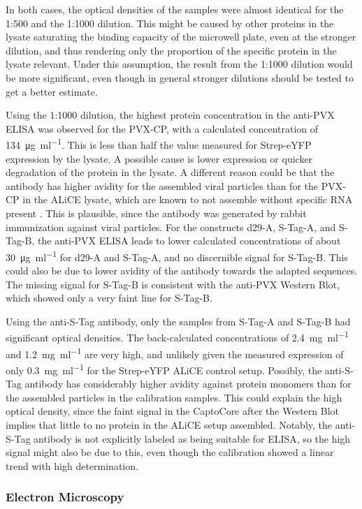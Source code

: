In both cases, the optical densities of the samples were almost identical for the 1:500 and the 1:1000 dilution. This might be caused by other proteins in the lysate saturating the binding capacity of the microwell plate, even at the stronger dilution, and thus rendering only the proportion of the specific protein in the lysate relevant. Under this assumption, the result from the 1:1000 dilution would be more significant, even though in general stronger dilutions should be tested to get a better estimate. 

Using the 1:1000 dilution, the highest protein concentration in the anti-PVX ELISA was observed for the PVX-CP, with a calculated concentration of \SI{134}{\micro\gram\per\milli\litre}. This is less than half the value measured for Strep-eYFP expression by the lysate. A possible cause is lower expression or quicker degradation of the protein in the lysate. A different reason could be that the antibody has higher avidity for the assembled viral particles than for the PVX-CP in the ALiCE lysate, which are known to not assemble without specific RNA present \cite{pvx_assembly}. This is plausible, since the antibody was generated by rabbit immunization against viral particles. For the constructs d29-A, S-Tag-A, and S-Tag-B, the anti-PVX ELISA leads to lower calculated concentrations of about \SI{30}{\micro\gram\per\milli\litre} for d29-A and S-Tag-A, and no discernible signal for S-Tag-B. This could also be due to lower avidity of the antibody towards the adapted sequences. The missing signal for S-Tag-B is consistent with the anti-PVX Western Blot, which showed only a very faint line for S-Tag-B. 

Using the anti-S-Tag antibody, only the samples from S-Tag-A and S-Tag-B had significant optical densities. The back-calculated concentrations of \SI{2.4}{\milli\gram\per\milli\litre} and \SI{1.2}{\milli\gram\per\milli\litre} are very high, and unlikely given the measured expression of only \SI{0.3}{\milli\gram\per\milli\litre} for the Strep-eYFP ALiCE control setup. Possibly, the anti-S-Tag antibody has considerably higher avidity against protein monomers than for the assembled particles in the calibration samples. This could explain the high optical density, since the faint signal in the CaptoCore after the Western Blot implies that little to no protein in the ALiCE setup assembled. Notably, the anti-S-Tag antibody is not explicitly labeled as being suitable for ELISA, so the high signal might also be due to this, even though the calibration showed a linear trend with high determination.

\subsubsection{Electron Microscopy}

